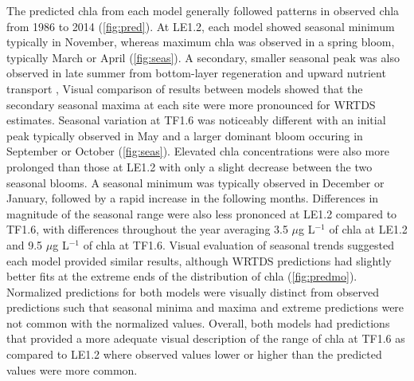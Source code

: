 \documentclass[letterpaper,12pt,oneside]{article}\usepackage[]{graphicx}\usepackage[]{color}
\newcommand{\mugl}{$\mu$g L$^{-1}$ }
\begin{document}
The predicted \ac{chla} from each model generally followed patterns in observed \ac{chla} from 1986 to 2014 (\cref{fig:pred}).  At LE1.2, each model showed seasonal minimum typically in November, whereas maximum \ac{chla} was observed in a spring bloom, typically March or April (\cref{fig:seas}).  A secondary, smaller seasonal peak was also observed in late summer from bottom-layer regeneration and upward nutrient transport \citep{Testa08a}, Visual comparison of results between models showed that the secondary seasonal maxima at each site were more pronounced for \ac{WRTDS} estimates.  Seasonal variation at TF1.6 was noticeably different with an initial peak typically observed in May and a larger dominant bloom occuring in September or October (\cref{fig:seas}).  Elevated \ac{chla}  concentrations were also more prolonged than those at LE1.2 with only a slight decrease between the two seasonal blooms.  A seasonal minimum was typically observed in December or January, followed by a rapid increase in the following months.  Differences in magnitude of the seasonal range were also less prononced at LE1.2 compared to TF1.6, with differences throughout the year averaging 3.5 \mugl of \ac{chla} at LE1.2 and 9.5 \mugl of \ac{chla} at TF1.6. Visual evaluation of seasonal trends suggested each model provided similar results, although \ac{WRTDS} predictions had slightly better fits at the extreme ends of the distribution of \ac{chla} (\cref{fig:predmo}).  Normalized predictions for both models were visually distinct from observed predictions such that seasonal minima and maxima and extreme predictions were not common with the normalized values.  Overall, both models had predictions that provided a more adequate visual description of the range of \ac{chla} at TF1.6 as compared to LE1.2 where observed values lower or higher than the predicted values were more common.  
\end{document}
